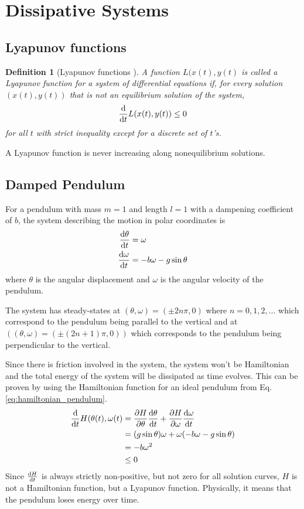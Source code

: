 \documentclass[11pt,1in]{article}
\newtheorem{definition}{Definition}
\begin{document}
\section{Dissipative Systems}
\subsection{Lyapunov functions}
\begin{definition}[Lyapunov functions \cite{diff_eq}]	
A function $L(x(t), y(t)$ is called a \emph{Lyapunov function} for a system of differential equations if, for every solution $(x(t), y(t))$ that is not an equilibrium solution of the system,
\begin{align}
\derivative{}{t} L(x(t), y(t))  \leq 0
\end{align}
for all $t$ with strict inequality except for a discrete set of $t$'s. 
\end{definition}
A Lyapunov function is never increasing along nonequilibrium solutions.

\subsection{Damped Pendulum}
For a pendulum with mass $m = 1$ and length $l = 1$ with a dampening coefficient of $b$, the system describing the motion in polar coordinates is
\begin{align}
\derivative{\theta}{t} &= \omega \\
\derivative{\omega}{t} &= - b \omega - g \sin\theta
\end{align}
where $\theta$ is the angular displacement and $\omega$ is the angular velocity of the pendulum.

The system has steady-states at $(\theta, \omega) = (\pm 2n\pi,0)$ where $n = 0, 1, 2, \ldots$ which correspond to the pendulum being parallel to the vertical and at $((\theta, \omega) = (\pm (2n + 1)\pi,0))$ which corresponds to the pendulum being perpendicular to the vertical. 

Since there is friction involved in the system, the system won't be Hamiltonian and the total energy of the system will be dissipated as time evolves. This can be proven by using the Hamiltonian function for an ideal pendulum from Eq. \ref{eq:hamiltonian_pendulum}. 
\begin{align}
\derivative{}{t}H(\theta(t), \omega(t) &= \frac{\partial H}{\partial \theta} \derivative{\theta}{t} + \frac{\partial H}{\partial \omega} \derivative{\omega}{t} \\
&= (g \sin\theta ) \omega + \omega (- b \omega - g \sin\theta) \nonumber \\
&= - b \omega^2 \\ 
&\leq 0 \nonumber
\end{align}
Since $\derivative{H}{t}$ is always strictly non-positive, but not zero for all solution curves, $H$ is not a Hamiltonian function, but a Lyapunov function. Physically, it means that the pendulum loses energy over time.  
\end{document}
